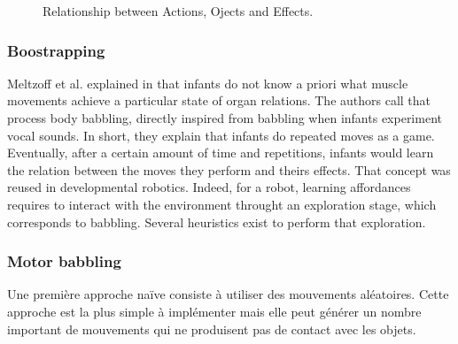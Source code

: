 \documentclass{llncs}
\begin{document}

\begin{figure}[!h]
\centering

  \label{fig:affordances}
	\caption{Relationship between Actions, Ojects and Effects.}

\end{figure}

\subsubsection{Boostrapping}
Meltzoff et al. explained in \cite{EDP:EDP157} that infants do not know a priori what muscle movements achieve a particular state of organ relations. The authors call that process body babbling, directly inspired from babbling when infants experiment vocal sounds. In short, they explain that infants do repeated moves as a game. Eventually, after a certain amount of time and repetitions, infants would learn the relation between the moves they perform and theirs effects. That concept was reused in developmental robotics. Indeed, for a robot, learning affordances requires to interact with the environment throught an exploration stage, which corresponds to babbling. Several heuristics exist to perform that exploration.

\subsubsection{Motor babbling}
Une première approche naïve consiste à utiliser des mouvements aléatoires. Cette approche est la plus simple à implémenter mais elle peut générer un nombre important de mouvements qui ne produisent pas de contact avec les objets.
\end{document}
